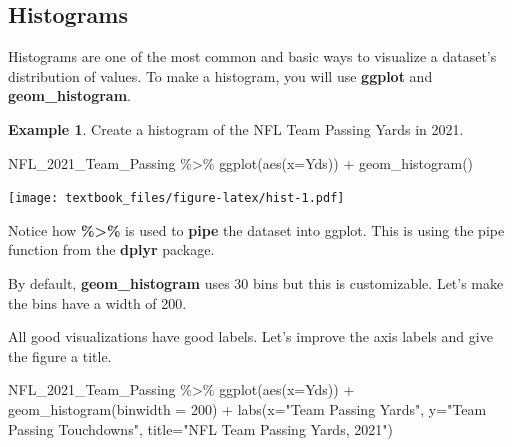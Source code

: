 \documentclass[
  11pt,
]{book}
\newenvironment{Shaded}{\begin{snugshade}}{\end{snugshade}}
\newcommand{\AttributeTok}[1]{\textcolor[rgb]{0.77,0.63,0.00}{#1}}
\newcommand{\DecValTok}[1]{\textcolor[rgb]{0.00,0.00,0.81}{#1}}
\newcommand{\FunctionTok}[1]{\textcolor[rgb]{0.00,0.00,0.00}{#1}}
\newcommand{\NormalTok}[1]{#1}
\newcommand{\SpecialCharTok}[1]{\textcolor[rgb]{0.00,0.00,0.00}{#1}}
\newcommand{\StringTok}[1]{\textcolor[rgb]{0.31,0.60,0.02}{#1}}
\theoremstyle{definition}
\theoremstyle{definition}
\newtheorem{example}{Example}[chapter]
\theoremstyle{definition}
\theoremstyle{definition}
\theoremstyle{remark}
\begin{document}
\vfill
\newpage

\hypertarget{histograms}{%
\subsection{Histograms}\label{histograms}}

Histograms are one of the most common and basic ways to visualize a dataset's distribution of values. To make a histogram, you will use \textbf{ggplot} and \textbf{geom\_histogram}.

\begin{example}
Create a histogram of the NFL Team Passing Yards in 2021.

\begin{Shaded}
\begin{Highlighting}[]
\NormalTok{NFL\_2021\_Team\_Passing }\SpecialCharTok{\%\textgreater{}\%} 
  \FunctionTok{ggplot}\NormalTok{(}\FunctionTok{aes}\NormalTok{(}\AttributeTok{x=}\NormalTok{Yds)) }\SpecialCharTok{+} 
  \FunctionTok{geom\_histogram}\NormalTok{()}
\end{Highlighting}
\end{Shaded}

\texttt{[image: textbook\_files/figure-latex/hist-1.pdf]}

Notice how \textbf{\%\textgreater\%} is used to \textbf{pipe} the dataset into ggplot. This is using the pipe function from the \textbf{dplyr} package.

\vfill
\newpage

By default, \textbf{geom\_histogram} uses 30 bins but this is customizable. Let's make the bins have a width of 200.

All good visualizations have good labels. Let's improve the axis labels and give the figure a title.

\begin{Shaded}
\begin{Highlighting}[]
\NormalTok{NFL\_2021\_Team\_Passing }\SpecialCharTok{\%\textgreater{}\%} \FunctionTok{ggplot}\NormalTok{(}\FunctionTok{aes}\NormalTok{(}\AttributeTok{x=}\NormalTok{Yds)) }\SpecialCharTok{+} 
  \FunctionTok{geom\_histogram}\NormalTok{(}\AttributeTok{binwidth =} \DecValTok{200}\NormalTok{) }\SpecialCharTok{+}
  \FunctionTok{labs}\NormalTok{(}\AttributeTok{x=}\StringTok{"Team Passing Yards"}\NormalTok{,}
       \AttributeTok{y=}\StringTok{"Team Passing Touchdowns"}\NormalTok{,}
       \AttributeTok{title=}\StringTok{"NFL Team Passing Yards, 2021"}\NormalTok{)}
\end{Highlighting}
\end{Shaded}


\end{example}
\end{document}
